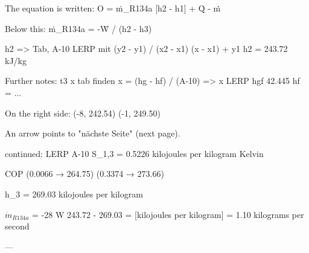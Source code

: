 The equation is written:  
O = ṁ_R134a [h2 - h1] + Q̇ - ṁ̇  

Below this:  
ṁ_R134a = -Ẇ / (h2 - h3)  

h2 => Tab, A-10 LERP mit (y2 - y1) / (x2 - x1) (x - x1) + y1  
h2 = 243.72 kJ/kg  

Further notes:  
t3 x tab finden  
x = (hg - hf) / (A-10) => x LERP hgf 42.445 hf = ...  

On the right side:  
(-8, 242.54)  
(-1, 249.50)  

An arrow points to "nächste Seite" (next page).

continued:  
LERP A-10  
S_1,3 = 0.5226 kilojoules per kilogram Kelvin  

COP  
(0.0066 → 264.75)  
(0.3374 → 273.66)  

h_3 = 269.03 kilojoules per kilogram  

\(\dot{m}_{R134a}\) = -28 W  
243.72 - 269.03 = [kilojoules per kilogram]  
= 1.10 kilograms per second  

---